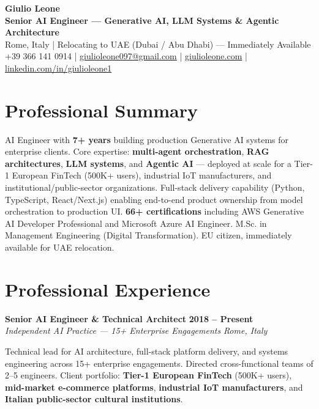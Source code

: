 \documentclass[11pt, letterpaper]{article}
\begin{document}
\begin{center}
    {\Huge \textbf{Giulio Leone}} \\ \vspace{4pt}
    {\Large \textbf{Senior AI Engineer --- Generative AI, LLM Systems \& Agentic Architecture}} \\ \vspace{8pt}
    Rome, Italy | Relocating to UAE (Dubai / Abu Dhabi) --- Immediately Available \\ \vspace{4pt}
    +39 366 141 0914 | \href{mailto:giulioleone097@gmail.com}{giulioleone097@gmail.com} | \href{https://giulioleone.com}{giulioleone.com} | \href{https://linkedin.com/in/giulioleone1}{linkedin.com/in/giulioleone1}
\end{center}

\vspace{1em}

\section*{Professional Summary}
AI Engineer with \textbf{7+ years} building production Generative AI systems for enterprise clients. Core expertise: \textbf{multi-agent orchestration}, \textbf{RAG architectures}, \textbf{LLM systems}, and \textbf{Agentic AI} --- deployed at scale for a Tier-1 European FinTech (500K+ users), industrial IoT manufacturers, and institutional/public-sector organizations. Full-stack delivery capability (Python, TypeScript, React/Next.js) enabling end-to-end product ownership from model orchestration to production UI. \textbf{66+ certifications} including AWS Generative AI Developer Professional and Microsoft Azure AI Engineer. M.Sc. in Management Engineering (Digital Transformation). EU citizen, immediately available for UAE relocation.

\section*{Professional Experience}

\noindent \textbf{Senior AI Engineer \& Technical Architect} \hfill \textbf{2018 -- Present} \\
\textit{Independent AI Practice --- 15+ Enterprise Engagements} \hfill \textit{Rome, Italy}
\vspace{4pt}

\noindent Technical lead for AI architecture, full-stack platform delivery, and systems engineering across 15+ enterprise engagements. Directed cross-functional teams of 2--5 engineers. Client portfolio: \textbf{Tier-1 European FinTech} (500K+ users), \textbf{mid-market e-commerce platforms}, \textbf{industrial IoT manufacturers}, and \textbf{Italian public-sector cultural institutions}.
\end{document}
